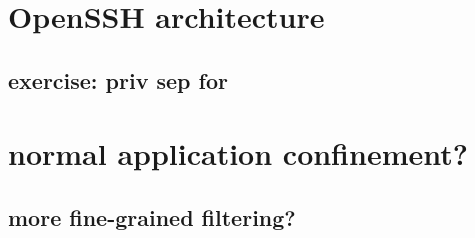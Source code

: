 \section{OpenSSH architecture}


\subsection{exercise: priv sep for}


\section{normal application confinement?}


\subsection{more fine-grained filtering?}



